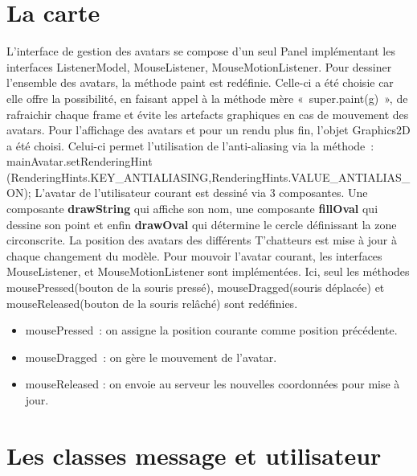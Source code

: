 \documentclass[a4paper,12pt]{report}
\begin{document}
    \section{La carte}
    L’interface de gestion des avatars se compose d’un seul Panel implémentant les interfaces ListenerModel, MouseListener, MouseMotionListener.
    \medbreak
    Pour dessiner l’ensemble des avatars, la méthode paint est redéfinie. Celle-ci a été choisie car elle offre la possibilité, en faisant appel à la méthode mère « super.paint(g) », de rafraichir chaque frame et évite les artefacts graphiques en cas de mouvement des avatars.
    \medbreak
    Pour l’affichage des avatars et pour un rendu plus fin, l’objet Graphics2D a été choisi. Celui-ci permet l’utilisation de l’anti-aliasing via la méthode : mainAvatar.setRenderingHint\\(RenderingHints.KEY\_ANTIALIASING,RenderingHints.VALUE\_ANTIALIAS\_ON);
    \medbreak
    L’avatar de l’utilisateur courant est dessiné via 3 composantes. Une composante \textbf{drawString} qui affiche son nom, une composante \textbf{fillOval} qui dessine son point et enfin \textbf{drawOval} qui détermine le cercle définissant la zone circonscrite.
    \medbreak
    La position des avatars des différents T’chatteurs est mise à jour à chaque changement du modèle.
    \medbreak
    Pour mouvoir l’avatar courant, les interfaces MouseListener, et MouseMotionListener sont implémentées.
    \medbreak
    Ici, seul les méthodes mousePressed(bouton de la souris pressé), mouseDragged(souris déplacée) et mouseReleased(bouton de la souris relâché) sont redéfinies.
    \bigbreak
    \begin{itemize}
      \item mousePressed : on assigne la position courante comme position précédente.
      \item mouseDragged : on gère le mouvement de l’avatar.
      \item mouseReleased : on envoie au serveur les nouvelles coordonnées pour mise à jour.
    \end{itemize}

    \section{Les classes message et utilisateur}
\end{document}
